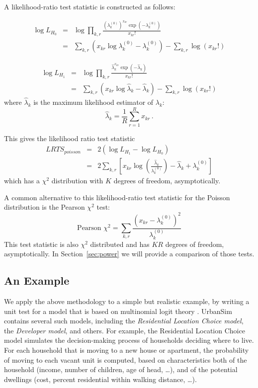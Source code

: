 A likelihood-ratio test statistic is constructed as follows:

\begin{eqnarray*}
\log L_{H_0}& =& \log \prod_{k,r} \frac{(\lambda_k^{(0)})^{x_{kr}}
    \exp(-\lambda_k^{(0)})}{x_{kr}!} \\
 &= &\sum_{k,r} (x_{kr}\log \lambda_k^{(0)}
    - \lambda_k^{(0)}) - \sum_{k,r} \log (x_{kr}!)
\end{eqnarray*}


 \begin{eqnarray*}
\log L_{H_1} &= &\log \prod_{k,r} \frac{\hat{\lambda}_{k}^{x_{kr}}
    \exp(-\hat{\lambda}_{k})}{x_{kr}!} \\
&= &\sum_{k,r} (x_{kr}\log \hat{\lambda}_{k}
    - \hat{\lambda}_{k}) - \sum_{k,r} \log (x_{kr}!)
\end{eqnarray*}
where $\hat{\lambda}_{k}$ is the maximum likelihood estimator of $\lambda_{k}$:
\[
\hat{\lambda}_{k} = \frac{1}{R}\sum_{r=1}^R x_{kr}\,.
\]

This gives the likelihood ratio test statistic
\begin{eqnarray*}
LRTS_{poisson}  & = & 2(\log L_{H_1} - \log L_{H_0}) \\
&= &2 \sum_{k,r} \left[ x_{kr} \log
\left(\frac{\hat{\lambda}_{k}}{\lambda_k^{(0)}}\right) - \hat{\lambda}_{k} + \lambda_k^{(0)} \right]
\end{eqnarray*}
which has a $\chi^2$ distribution with $K$
degrees of freedom, asymptotically.

A common alternative to this likelihood-ratio test statistic for the Poisson
distribution is the Pearson $\chi^2$ test:
\[
\text{Pearson } \chi^2 = \sum_{k,r} \frac{(x_{kr} - \lambda_k^{(0)})^2}{\lambda_k^{(0)}}
\]
This test statistic is also $\chi^2$ distributed and has $KR$
degrees of freedom, asymptotically. In Section~\ref{sec:power} we will provide a
comparison of those tests.


\subsection{An Example}
\label{sec:example}

We apply the above methodology to a simple but realistic example, by
writing a unit test for a model that is based on multinomial logit theory
\cite{ben-akiva-lerman-1987,train-book-2003}.  UrbanSim contains several
such models, including the \emph{Residential Location Choice model}, the
\emph{Developer model}, and others.  For example, the Residential Location
Choice model simulates the decision-making process of households deciding
where to live.  For each household that is moving to a new house or
apartment, the probability of moving to each vacant unit is computed, based
on characteristics both of the household (income, number of children, age
of head, \ldots), and of the potential dwellings (cost, percent residential
within walking distance, \ldots).

